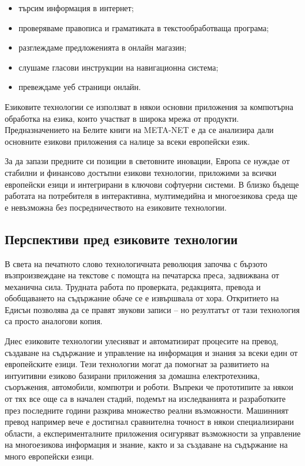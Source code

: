 \documentclass[]{../../metanetpaper}
\begin{document}
\begin{multicols}{2}
\begin{itemize}
\item търсим информация в интернет;
\item проверяваме правописа и граматиката в текстообработваща програма;
\item разглеждаме предложенията в онлайн магазин;
\item слушаме гласови инструкции на навигационна система;
\item превеждаме уеб страници онлайн.
\end{itemize}

Езиковите технологии се използват в някои основни приложения за компютърна обработка на езика, които участват в широка мрежа от продукти. Предназначението на Белите книги на META-NET е да се анализира дали основните езикови приложения са налице за всеки европейски език.


За да запази предните си позиции в световните иновации, Европа се нуждае от стабилни и финансово достъпни езикови технологии, приложими за всички европейски езици и интегрирани в ключови софтуерни системи.
В близко бъдеще работата на потребителя в интерактивна, мултимедийна и многоезикова  среда ще е  невъзможна
без посредничеството на езиковите технологии.

\subsection{Перспективи пред езиковите технологии}

В света на печатното слово технологичната революция започва с бързото възпроизвеждане на текстове с помощта на печатарска преса, задвижвана от механична сила. Трудната работа по проверката, редакцията, превода и обобщаването на съдържание обаче се е извършвала от хора. Откритието на Едисън позволява да се правят звукови записи – но резултатът от тази технология  са просто аналогови копия.

Днес езиковите технологии улесняват и автоматизират процесите на превод, създаване на съдържание и управление на информация и знания за всеки един от европейските езици. Тези технологии могат да помогнат за развитието на интуитивни
 езиково базирани приложения за домашна електротехника, съоръжения, автомобили, компютри и роботи. Въпреки че прототипите
 за някои от тях все още са в начален стадий, подемът на изследванията и разработките през последните години разкрива множество реални възможности. Машинният превод например вече е достигнал сравнителна точност в някои специализирани области, а
 експерименталните приложения осигуряват възможности за управление на
 многоезикова информация и знание, както и за
 създаване на съдържание на много европейски езици.


\end{multicols}
\end{document}
